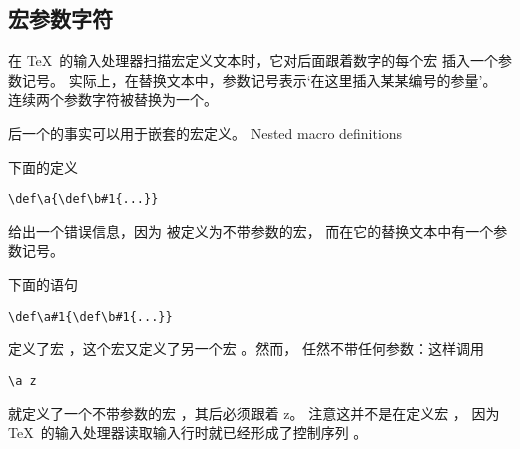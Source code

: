 \documentclass{book}
\begin{document}
\subsection{宏参数字符}

在 \TeX\ 的输入处理器扫描宏定义文本时，它对后面跟着数字的每个宏%
插入一个参数记号。
实际上，在替换文本中，参数记号表示`在这里插入某某编号的参量'。
连续两个参数字符被替换为一个。

后一个的事实可以用于嵌套的宏定义。
\label{nest:def}\howto Nested macro definitions\par
下面的定义
\begin{verbatim}
\def\a{\def\b#1{...}}
\end{verbatim}
给出一个错误信息，因为  被定义为不带参数的宏，
而在它的替换文本中有一个参数记号。

下面的语句
\begin{verbatim}
\def\a#1{\def\b#1{...}}
\end{verbatim}
定义了宏 ，这个宏又定义了另一个宏 。然而，
 任然不带任何参数：这样调用
\begin{verbatim}
\a z
\end{verbatim}
就定义了一个不带参数的宏 ，其后必须跟着 \n z。
注意这并不是在定义宏 ，
因为 \TeX\ 的输入处理器读取输入行时就已经形成了控制序列 。
\end{document}
